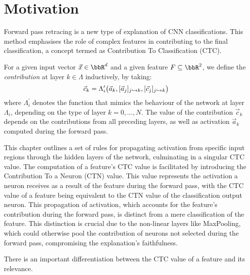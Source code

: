 \section{Motivation}

Forward pass retracing is a new type of explanation of CNN classifications. This method emphasises the role of complex features in contributing to the final classification, a concept termed as Contribution To Classification (CTC).

\begin{definition}[Contribution]
For a given input vector $\vec{x}\in \bbR^d$ and a given feature $F\subseteq \bbR^2$, we define the \emph{contribution} at layer $k\in \Lambda$ inductively, by taking:
\begin{equation*}
       \vec{c}_k = \Lambda_i^\prime\big(\vec{a}_k,[\vec{a}_j]_{j\hookrightarrow k},[\vec{c}_j]_{j\hookrightarrow k}\big)
\end{equation*}
where $\Lambda_i^\prime$ denotes the function that mimics the behaviour of the network at layer $\Lambda_i$, depending on the type of layer $k=0,\dots, N$. The value of the contribution $\vec{c}_k$ depends on the contributions from all preceding layers, as well as activation $\vec{a}_k$ computed during the forward pass.
\end{definition}

This chapter outlines a set of rules for propagating activation from specific input regions through the hidden layers of the network, culminating in a singular CTC value. The computation of a feature's CTC value is facilitated by introducing the Contribution To a Neuron (CTN) value. This value represents the activation a neuron receives as a result of the feature during the forward pass, with the CTC value of a feature being equivalent to the CTN value of the classification output neuron. This propagation of activation, which accounts for the feature's contribution during the forward pass, is distinct from a mere classification of the feature. This distinction is crucial due to the non-linear layers like MaxPooling, which could otherwise pool the contribution of neurons not selected during the forward pass, compromising the explanation's faithfulness.


There is an important differentiation between the CTC value of a feature and its relevance.

